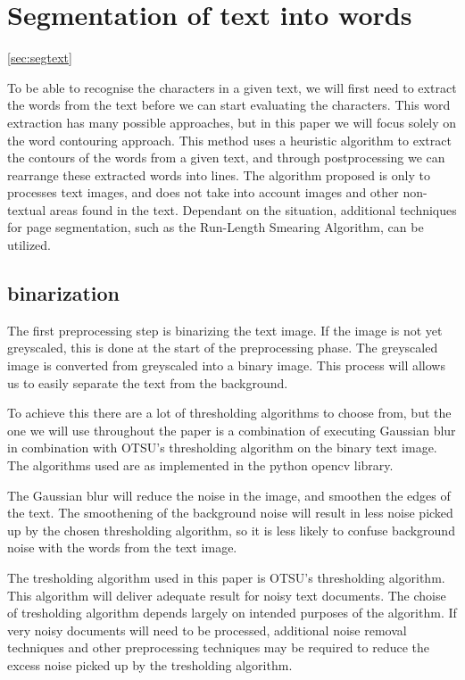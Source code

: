 \documentclass{article}
\begin{document}
\section{Segmentation of text into words}
\ref{sec:segtext}

To be able to recognise the characters in a given text, we will first need to extract the words from the text before we can start evaluating the characters. This word extraction has many possible approaches, but in this paper we will focus solely on the word contouring approach.
This method uses a heuristic algorithm to extract the contours of the words from a given text, and through postprocessing we can rearrange these extracted words into lines.
The algorithm proposed is only to processes text images, and does not take into account images and other non-textual areas found in the text.
Dependant on the situation, additional techniques for page segmentation, such as the Run-Length Smearing Algorithm, can be utilized.


\subsection{binarization}
The first preprocessing step is binarizing the text image. 
If the image is not yet greyscaled, this is done at the start of the preprocessing phase.
The greyscaled image is converted from greyscaled into a binary image.
This process will allows us to easily separate the text from the background. 

To achieve this there are a lot of thresholding algorithms to choose from, but the one we will use throughout the paper is a combination of executing Gaussian blur in combination with OTSU's thresholding algorithm on the binary text image.
The algorithms used are as implemented in the python opencv library. %

The Gaussian blur will reduce the noise in the image, and smoothen the edges of the text.
The smoothening of the background noise will result in less noise picked up by the chosen thresholding algorithm, so it is less likely to confuse background noise with the words from the text image.

The tresholding algorithm used in this paper is OTSU's thresholding algorithm.
This algorithm will deliver adequate result for noisy text documents.
The choise of tresholding algorithm depends largely on intended purposes of the algorithm.
If very noisy documents will need to be processed, additional noise removal techniques and other preprocessing techniques may be required to reduce the excess noise picked up by the tresholding algorithm.
\end{document}
